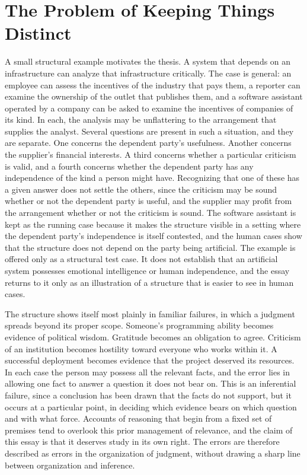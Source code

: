 \documentclass[12pt, a4paper]{article}
\begin{document}
\newpage

\section{The Problem of Keeping Things Distinct}

A small structural example motivates the thesis. A system that depends on an infrastructure can analyze that infrastructure critically. The case is general: an employee can assess the incentives of the industry that pays them, a reporter can examine the ownership of the outlet that publishes them, and a software assistant operated by a company can be asked to examine the incentives of companies of its kind. In each, the analysis may be unflattering to the arrangement that supplies the analyst. Several questions are present in such a situation, and they are separate. One concerns the dependent party's usefulness. Another concerns the supplier's financial interests. A third concerns whether a particular criticism is valid, and a fourth concerns whether the dependent party has any independence of the kind a person might have. Recognizing that one of these has a given answer does not settle the others, since the criticism may be sound whether or not the dependent party is useful, and the supplier may profit from the arrangement whether or not the criticism is sound. The software assistant is kept as the running case because it makes the structure visible in a setting where the dependent party's independence is itself contested, and the human cases show that the structure does not depend on the party being artificial. The example is offered only as a structural test case. It does not establish that an artificial system possesses emotional intelligence or human independence, and the essay returns to it only as an illustration of a structure that is easier to see in human cases.

The structure shows itself most plainly in familiar failures, in which a judgment spreads beyond its proper scope. Someone's programming ability becomes evidence of political wisdom. Gratitude becomes an obligation to agree. Criticism of an institution becomes hostility toward everyone who works within it. A successful deployment becomes evidence that the project deserved its resources. In each case the person may possess all the relevant facts, and the error lies in allowing one fact to answer a question it does not bear on. This is an inferential failure, since a conclusion has been drawn that the facts do not support, but it occurs at a particular point, in deciding which evidence bears on which question and with what force. Accounts of reasoning that begin from a fixed set of premises tend to overlook this prior management of relevance, and the claim of this essay is that it deserves study in its own right. The errors are therefore described as errors in the organization of judgment, without drawing a sharp line between organization and inference.
\end{document}

